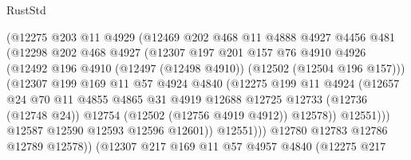 \begin{lexlean}{RustStd}
\begin{coremodule}
                      (@12275
                        @203
                        @11
                        @4929
                        (@12469
                          @202
                          @468
                          @11
                          @4888
                          @4927
                          @4456
                          @481
                          (@12298
                            @202
                            @468
                            @4927
                            (@12307
                              @197
                              @201
                              @157
                              @76
                              @4910
                              @4926
                              (@12492
                                @196
                                @4910
                                (@12497 (@12498 @4910))
                                (@12502 (@12504 @196 @157)))
                              (@12307
                                @199
                                @169
                                @11
                                @57
                                @4924
                                @4840
                                (@12275
                                  @199
                                  @11
                                  @4924
                                  (@12657
                                    @24
                                    @70
                                    @11
                                    @4855
                                    @4865
                                    @31
                                    @4919
                                    @12688
                                    @12725
                                    @12733
                                    (@12736 (@12748 @24))
                                    @12754
                                    (@12502 (@12756 @4919 @4912))
                                    @12578))
                                @12551)))
                          @12587
                          @12590
                          @12593
                          @12596
                          @12601))
                      @12551)))
                @12780
                @12783
                @12786
                @12789
                @12578))
            (@12307
              @217
              @169
              @11
              @57
              @4957
              @4840
              (@12275
                @217

\end{coremodule}
\end{lexlean}
